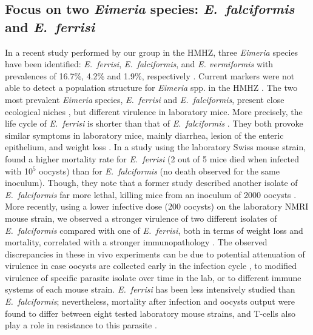 \subsection{Focus on two \textit{Eimeria} species: \textit{E.~falciformis} and \textit{E.~ferrisi}}
In a recent study performed by our group in the HMHZ, three \textit{Eimeria} species have been identified: \textit{E.~ferrisi}, \textit{E.~falciformis}, and \textit{E. vermiformis} with prevalences of 16.7\%, 4.2\% and 1.9\%, respectively \citep{jarquin-diaz_detection_2019}. Current markers were not able to detect a population structure for \textit{Eimeria} spp. in the HMHZ \citep{jarquin-diaz_generalist_2020}. The two most prevalent \textit{Eimeria} species, \textit{E.~ferrisi} and \textit{E.~falciformis}, present close ecological niches \parencite[\textit{E.~ferrisi} infects the cecum villar epithelial cells and \textit{E.~falciformis} the cecum crypt cells;][]{schito_comparison_1996}, but different virulence in laboratory mice. More precisely, the life cycle of \textit{E.~ferrisi} is shorter than that of \textit{E.~falciformis} \citep{al-khlifeh_eimeria_2019, schito_comparison_1996}. They both provoke similar symptoms in laboratory mice, mainly diarrhea, lesion of the enteric epithelium, and weight loss \citep{ankrom_life_1975, ehret_dual_2017, schito_comparison_1996}. In a study using the laboratory Swiss mouse strain, \cite{tilahun_oocyst_1981} found a higher mortality rate for \textit{E.~ferrisi} (2 out of 5 mice died when infected with 10$^5$  oocysts) than for \textit{E.~falciformis} (no death observed for the same inoculum). Though, they note that a former study described another isolate of \textit{E.~falciformis} far more lethal, killing mice from an inoculum of 2000 oocysts \citep{mesfin_pathological_1978}. More recently, using a lower infective dose (200 oocysts) on the laboratory NMRI mouse strain, we observed a stronger virulence of two different isolates of \textit{E.~falciformis} compared with one of \textit{E.~ferrisi}, both in terms of weight loss and mortality, correlated with a stronger immunopathology \citep{al-khlifeh_eimeria_2019}. The observed discrepancies in these in vivo experiments can be due to potential attenuation of virulence in case oocysts are collected early in the infection cycle \citep{mcdonald_endogenous_1987}, to modified virulence of specific parasite isolate over time in the lab, or to different immune systems of each mouse strain. \textit{E.~ferrisi} has been less intensively studied than \textit{E.~falciformis}; nevertheless, mortality after infection and oocysts output were found to differ between eight tested laboratory mouse strains, and T-cells also play a role in resistance to this parasite \citep{klesius_strain-dependent_1979}.
